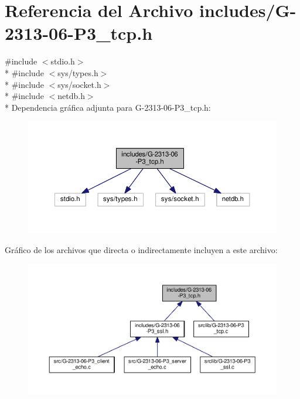 \hypertarget{G-2313-06-P3__tcp_8h}{}\section{Referencia del Archivo includes/\+G-\/2313-\/06-\/\+P3\+\_\+tcp.h}
\label{G-2313-06-P3__tcp_8h}
{\ttfamily \#include $<$stdio.\+h$>$}\\*
{\ttfamily \#include $<$sys/types.\+h$>$}\\*
{\ttfamily \#include $<$sys/socket.\+h$>$}\\*
{\ttfamily \#include $<$netdb.\+h$>$}\\*
Dependencia gráfica adjunta para G-\/2313-\/06-\/\+P3\+\_\+tcp.h\+:
\nopagebreak
\begin{figure}[H]
\begin{center}
\leavevmode
\includegraphics[width=350pt]{G-2313-06-P3__tcp_8h__incl}
\end{center}
\end{figure}
Gráfico de los archivos que directa o indirectamente incluyen a este archivo\+:
\nopagebreak
\begin{figure}[H]
\begin{center}
\leavevmode
\includegraphics[width=350pt]{G-2313-06-P3__tcp_8h__dep__incl}
\end{center}
\end{figure}
